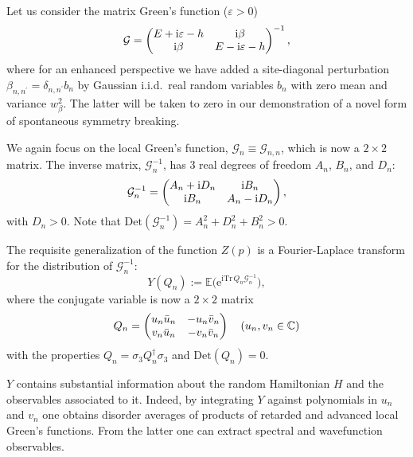\documentclass[aps,prl,twocolumn,letterpaper,superscriptaddress]{revtex4-2}
\begin{document}
Let us consider the matrix Green's function ($\varepsilon > 0$)
\begin{equation}
    \mathcal{G} = \begin{pmatrix} E + \mathrm{i}\varepsilon - h & \mathrm{i}\beta \cr \mathrm{i}\beta &E - \mathrm{i}\varepsilon - h \end{pmatrix}^{-1} ,
\end{equation}
where for an enhanced perspective we have added a site-diagonal perturbation $\beta_{n,n^\prime} = \delta_{n,n^\prime} b_n$ by Gaussian i.i.d.\ real random variables $b_n$ with zero mean and variance $w_\beta^2$. The latter will be taken to zero in our demonstration of a novel form of spontaneous symmetry breaking.

We again focus on the local Green's function, $\mathcal{G}_n \equiv \mathcal{G}_{n,n}$, which is now a $2 \times 2$ matrix. The inverse matrix, $\mathcal{G}_n^{-1}$, has 3 real degrees of freedom $A_n$, $B_n$, and $D_n$:
\begin{equation}\label{eq:strucG}
    \mathcal{G}_n^{-1} = \begin{pmatrix} A_n + \mathrm{i} D_n & \mathrm{i} B_n \cr \mathrm{i} B_n &A_n - \mathrm{i} D_n \end{pmatrix} ,
\end{equation}
with $D_n > 0$. Note that $\mathrm{Det}(\mathcal{G}_n^{-1}) = A_n^2 + D_n^2 + B_n^2 > 0$.

The requisite generalization of the function $Z(p)$ is a Fourier-Laplace transform for the distribution of $\mathcal{G}_n^{-1}$:
\begin{equation}
    Y(Q_n) := \mathbb{E} \big( \mathrm{e}^{\mathrm{i} \mathrm{Tr}\, Q_n \mathcal{G}_n^{-1}} \big) ,
\end{equation}
where the conjugate variable is now a $2 \times 2$ matrix
\begin{equation}\label{eq:rankone}
    Q_n = \begin{pmatrix} u_n \bar{u}_n &- u_n \bar{v}_n \cr v_n \bar{u}_n &- v_n \bar{v}_n \end{pmatrix} \quad (u_n , v_n \in \mathbb{C})
\end{equation}
with the properties $Q_n = \sigma_3 Q_n^\dagger \sigma_3$ and $\mathrm{Det}(Q_n) = 0$.

$Y$ contains substantial information about the random Hamiltonian $H$ and the observables associated to it. Indeed, by integrating $Y$ against polynomials in $u_n$ and $v_n$ one obtains disorder averages of products of retarded and advanced local Green's functions. {}From the latter one can extract spectral and wavefunction observables.
\end{document}
